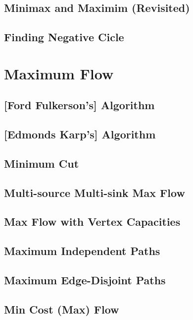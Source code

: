 	\subsection {Minimax and Maximim (Revisited)}
	\subsection {Finding Negative Cicle}
\section {Maximum Flow}
	\subsection {[Ford Fulkerson's] Algorithm}
	\subsection {[Edmonds Karp's] Algorithm}
	\subsection {Minimum Cut}
	\subsection {Multi-source Multi-sink Max Flow}
	\subsection {Max Flow with Vertex Capacities}
	\subsection {Maximum Independent Paths}
	\subsection {Maximum Edge-Disjoint Paths}
	\subsection {Min Cost (Max) Flow}
